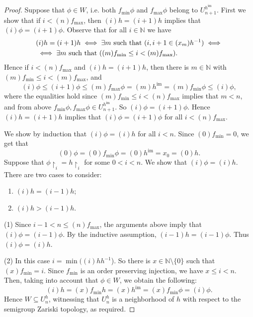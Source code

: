\documentclass[11pt]{amsart}
\theoremstyle{definition}
\newcommand{\N}{\mathbb N}
\newcommand{\im}{\operatorname{im}}
\begin{document}
\begin{proof}
Suppose that \(\phi\in W\), i.e. both $f_{\min}\phi$ and $f_{\max}\phi$ belong to $U_{n+1}^{h^{\im}}$. First we show that if \(i<(n)f_{\max}\), then $(i)h=(i+1)h$ implies that $(i)\phi=(i+1)\phi$.
Observe that for all \(i\in \N\) we have
\begin{align*}
&(i)h=(i+1)h \iff \exists m \hbox{ such that } (i, i+1\in (x_m)h^{-1}) \iff\\
& \iff \exists m \hbox{ such that } ((m)f_{\min} \leq i< (m)f_{\max}).
\end{align*}
Hence if \(i< (n)f_{\max}\) and \((i)h=(i+1)h\), then there is \(m\in\N\) with \((m)f_{\min} \leq i< (m)f_{\max}\), and
$$(i)\phi\leq (i+1)\phi\leq (m)f_{\max}\phi=(m)h^{\im} =(m)f_{\min}\phi\leq (i)\phi,$$
where the equalities hold since \((m)f_{\min}\leq i<(n)f_{\max}\) implies that \(m<n\), and from above $f_{\min}\phi, f_{\max}\phi\in U_{n+1}^{h^{\im}}$. So \((i)\phi=(i+1)\phi\).
Hence $(i)h=(i+1)h$ implies that $(i)\phi=(i+1)\phi$ for all  \(i<(n)f_{\max}\).

We show by induction that  \((i)\phi=(i)h\) for all \(i<n\).
Since \((0)f_{\min}=0\), we get that $$(0)\phi=(0)f_{\min}\phi=(0)h^{\im}=x_0=(0)h.$$
Suppose that $\phi{\restriction}_i=h{\restriction}_i$ for some \(0<i<n\). We show that \((i)\phi=(i)h\).
There are two cases to consider:
\begin{enumerate}
 \item  \((i)h=(i-1)h\);
 \item  \((i)h>(i-1)h\).
\end{enumerate}

 (1)  Since \(i-1<n\leq (n)f_{\max}\), the arguments above imply that $(i)\phi=(i-1)\phi$.  By the inductive assumption, $(i-1)h=(i-1)\phi$. Thus $(i)\phi=(i)h$.

 (2) In this case \(i=\min((i)hh^{-1}\)). So there is \(x\in \N\setminus \{0\}\) such that \((x)f_{\min}=i\). Since $f_{\min}$ is an order preserving injection, we have \(x\leq i<n\). Then, taking into account that $\phi\in W$, we obtain the following:
\[(i)h=(x)f_{\min}h=(x)h^{\im}=(x)f_{\min}\phi=(i)\phi.\]
Hence $W\subseteq U_n^h$, witnessing that $U_n^h$ is a neighborhood of $h$ with respect to the semigroup Zariski topology, as required.
\end{proof}

\end{document}
